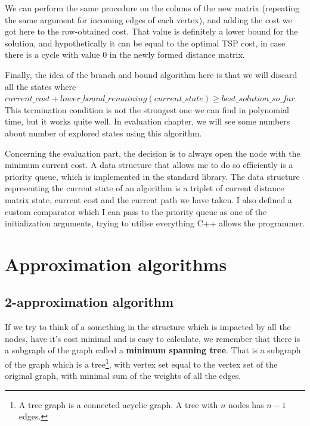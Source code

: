 \documentclass[12pt,twoside,notitlepage]{report}
\begin{document}
\smallskip

We can perform the same procedure on the colums of the new matrix (repeating the same argument for incoming edges of each vertex), and adding the cost we got here to the row-obtained cost. That value is definitely a lower bound for the solution, and hypothetically it can be equal to the optimal TSP cost, in case there is a cycle with value 0 in the newly formed distance matrix. 

\smallskip

Finally, the idea of the branch and bound algorithm here is that we will discard all the states where $current\_cost + lower\_bound\_remaining(current\_state) \geq best\_solution\_so\_far$. This termination condition is not the strongest one we can find in polynomial time, but it works quite well. In evaluation chapter, we will see some numbers about number of explored states using this algorithm.

\smallskip

Concerning the evaluation part, the decision is to always open the node with the minimum current cost. A data structure that allows me to do so efficiently is a priority queue, which is implemented in the standard library. The data structure representing the current state of an algorithm is a triplet of current distance matrix state, current cost and the current path we have taken. I also defined a custom comparator which I can pass to the priority queue as one of the initialization arguments, trying to utilise everything C++ allows the programmer.

\section{Approximation algorithms}

\subsection{2-approximation algorithm}

If we try to think of a something in the structure which is impacted by all the nodes, have it's cost minimal and is easy to calculate, we remember that there is a subgraph of the graph called a {\bf minimum spanning tree}. That is a subgraph of the graph which is a tree\footnote{A tree graph is a connected acyclic graph. A tree with $n$ nodes has $n - 1$ edges.}, with vertex set equal to the vertex set of the original graph, with minimal sum of the weights of all the edges.
\end{document}
